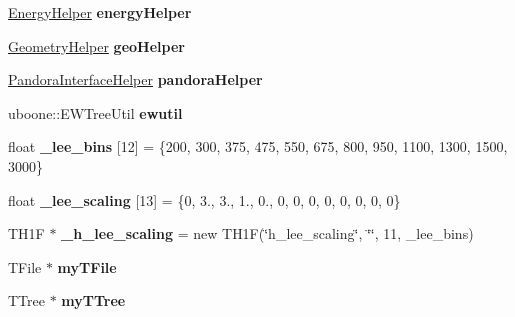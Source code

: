 \begin{DoxyCompactItemize}
\item 
\hypertarget{group__lee_ga15efa0b525385a8f0ac4547690d44194}{\hyperlink{classlee_1_1EnergyHelper}{Energy\-Helper} {\bfseries energy\-Helper}}\label{group__lee_ga15efa0b525385a8f0ac4547690d44194}

\item 
\hypertarget{group__lee_gaa53a7fef751a9f2aa891b067875eb19b}{\hyperlink{classlee_1_1GeometryHelper}{Geometry\-Helper} {\bfseries geo\-Helper}}\label{group__lee_gaa53a7fef751a9f2aa891b067875eb19b}

\item 
\hypertarget{group__lee_ga00fc07207cfb81cd3cbbe5a8785d3c23}{\hyperlink{classlee_1_1PandoraInterfaceHelper}{Pandora\-Interface\-Helper} {\bfseries pandora\-Helper}}\label{group__lee_ga00fc07207cfb81cd3cbbe5a8785d3c23}

\item 
\hypertarget{group__lee_gaf8493a6adc146f58425a9808bde7de2f}{uboone\-::\-E\-W\-Tree\-Util {\bfseries ewutil}}\label{group__lee_gaf8493a6adc146f58425a9808bde7de2f}

\item 
\hypertarget{group__lee_ga228a9ca7bca5fedf7187f5db8358fd00}{float {\bfseries \-\_\-lee\-\_\-bins} \mbox{[}12\mbox{]} = \{200, 300, 375, 475, 550, 675, 800, 950, 1100, 1300, 1500, 3000\}}\label{group__lee_ga228a9ca7bca5fedf7187f5db8358fd00}

\item 
\hypertarget{group__lee_ga917c3c0cff016b2757b303818dc9b138}{float {\bfseries \-\_\-lee\-\_\-scaling} \mbox{[}13\mbox{]} = \{0, 3., 3., 1., 0., 0, 0, 0, 0, 0, 0, 0, 0\}}\label{group__lee_ga917c3c0cff016b2757b303818dc9b138}

\item 
\hypertarget{group__lee_ga23a7d7c06b601ec3488237c7a70a79f0}{T\-H1\-F $\ast$ {\bfseries \-\_\-h\-\_\-lee\-\_\-scaling} = new T\-H1\-F(\char`\"{}h\-\_\-lee\-\_\-scaling\char`\"{}, \char`\"{}\char`\"{}, 11, \-\_\-lee\-\_\-bins)}\label{group__lee_ga23a7d7c06b601ec3488237c7a70a79f0}

\item 
\hypertarget{group__lee_ga8a86ec4686558f03c8a2be30a6bbcc2a}{T\-File $\ast$ {\bfseries my\-T\-File}}\label{group__lee_ga8a86ec4686558f03c8a2be30a6bbcc2a}

\item 
\hypertarget{group__lee_ga20daae4b8c56ed5c2c2fd6b7b2a490dc}{T\-Tree $\ast$ {\bfseries my\-T\-Tree}}\label{group__lee_ga20daae4b8c56ed5c2c2fd6b7b2a490dc}


\end{DoxyCompactItemize}
